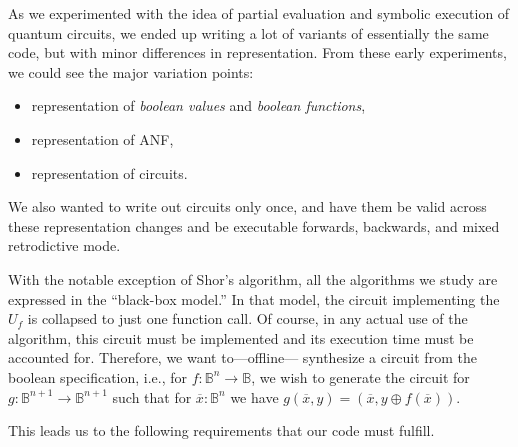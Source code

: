 \documentclass[sigplan,screen]{acmart}
\newcommand{\Bool}{\ensuremath{\mathbb{B}}}
\theoremstyle{definition}
\begin{document}
As we experimented with the idea of partial evaluation and symbolic
execution of quantum circuits, we ended up writing a lot of variants of
essentially the same code, but with minor differences in representation.
From these early experiments, we could see the major variation points:
\begin{itemize}
  \item representation of \emph{boolean values} and \emph{boolean functions},
  \item representation of ANF,
  \item representation of circuits.
\end{itemize}
We also wanted to write out circuits only once, and have them be valid
across these representation changes and be executable forwards,
backwards, and mixed retrodictive mode.

With the notable exception of Shor's algorithm, all the algorithms we
study are expressed in the ``black-box model.'' In that model, the
circuit implementing the $U_f$ is collapsed to just one function
call. Of course, in any actual use of the algorithm, this circuit must
be implemented and its execution time must be accounted
for. Therefore, we want to---offline--- synthesize a circuit from the
boolean specification, i.e., for $f : \Bool^n \rightarrow\Bool$, we
wish to generate the circuit for
$g : \Bool^{n+1} \rightarrow \Bool^{n+1}$ such that for
$\overline{x} : \Bool^n$ we have
$g(\overline{x},y) = (\overline{x}, y \oplus f(\overline{x}))$.

This leads us to the following requirements that our code must
fulfill.
\end{document}
